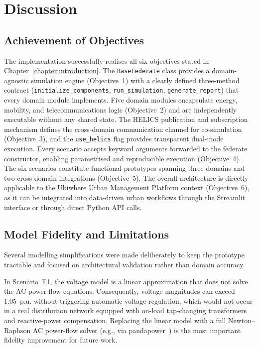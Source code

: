 \section{Discussion}

\subsection{Achievement of Objectives}

The implementation successfully realises all six objectives stated in Chapter~\ref{chapter:introduction}. The \texttt{BaseFederate} class provides a domain-agnostic simulation engine (Objective~1) with a clearly defined three-method contract (\texttt{initialize\_components}, \texttt{run\_simulation}, \texttt{generate\_report}) that every domain module implements. Five domain modules encapsulate energy, mobility, and telecommunications logic (Objective~2) and are independently executable without any shared state. The HELICS publication and subscription mechanism defines the cross-domain communication channel for co-simulation (Objective~3), and the \texttt{use\_helics} flag provides transparent dual-mode execution. Every scenario accepts keyword arguments forwarded to the federate constructor, enabling parametrised and reproducible execution (Objective~4). The six scenarios constitute functional prototypes spanning three domains and two cross-domain integrations (Objective~5). The overall architecture is directly applicable to the Ubiwhere Urban Management Platform context (Objective~6), as it can be integrated into data-driven urban workflows through the Streamlit interface or through direct Python API calls.

\subsection{Model Fidelity and Limitations}

Several modelling simplifications were made deliberately to keep the prototype tractable and focused on architectural validation rather than domain accuracy.

In Scenario~E1, the voltage model is a linear approximation that does not solve the AC power-flow equations. Consequently, voltage magnitudes can exceed 1.05~p.u. without triggering automatic voltage regulation, which would not occur in a real distribution network equipped with on-load tap-changing transformers and reactive-power compensation. Replacing the linear model with a full Newton--Raphson AC power-flow solver (e.g., via pandapower~\cite{pandapower}) is the most important fidelity improvement for future work.

